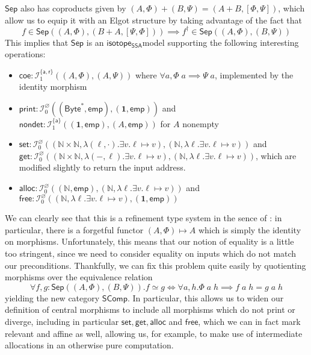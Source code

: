 \documentclass[acmsmall,screen,review]{acmart}
\newcommand{\mc}[1]{\ensuremath{\mathcal{#1}}}
\newcommand{\mb}[1]{\ensuremath{\mathbf{#1}}}
\newcommand{\ms}[1]{\ensuremath{\mathsf{#1}}}
\newcommand{\nats}{\mathbb{N}}
\newcommand{\taff}{{\{\ms{a}\}}}
\newcommand{\tint}{{\{\ms{a}, \ms{r}\}}}
\newcommand{\isotopessa}{\ms{isotope_{SSA}}}
\begin{document}
\(\ms{Sep}\) also has coproducts given by \((A, \Phi) + (B, \Psi) = (A + B, [\Phi, \Psi])\), which allow us to equip it with an Elgot structure by taking advantage of the fact that
\begin{equation}
  f \in \ms{Sep}((A, \Phi), (B + A, [\Psi, \Phi])) \implies f^\dagger \in \ms{Sep}((A, \Phi), (B, \Psi))
\end{equation}
This implies that \(\ms{Sep}\) is an \isotopessa model supporting the following
interesting operations:
\begin{itemize}
  \item \(\ms{coe}: \mc{I}^\tint_1((A, \Phi), (A, \Psi))\) where \(\forall a,
  \Phi\;a \implies \Psi\;a\), implemented by the identity morphism
  \item \(\ms{print}: \mc{I}^\varnothing_0((\ms{Byte}^*, \ms{emp}), (\mb{1},
  \ms{emp}))\) and \(\ms{nondet}: \mc{I}^\taff_1((\mb{1}, \ms{emp}), (A, \ms{emp}))\) for
  \(A\) nonempty
  \item \(\ms{set}: \mc{I}^\varnothing_0((\nats \times \nats, \lambda (\ell,
  \cdot). \exists v. \ell \mapsto v), (\nats, \lambda \ell. \exists v. \ell
  \mapsto v))\) and \(\ms{get}: \mc{I}^\varnothing_0((\nats \times \nats,
  \lambda (-, \ell). \exists v. \ell \mapsto v), (\nats, \lambda \ell. \exists
  v. \ell \mapsto v))\), which are modified slightly to return the input address.
  \item \(\ms{alloc}: \mc{I}^\varnothing_0((\nats, \ms{emp}), (\nats, \lambda
  \ell. \exists v. \ell \mapsto v))\) and \(\ms{free}: \mc{I}^\varnothing_0((\nats, \lambda \ell. \exists v. \ell \mapsto v), (\mb{1}, \ms{emp}))\)
\end{itemize}
We can clearly see that this is a refinement type system in the sence of
\cite{mellies-ftrs}: in particular, there is a forgetful functor \((A, \Phi)
\mapsto A\) which is simply the identity on morphisms. Unfortunately, this means
that our notion of equality is a little too stringent, since we need to consider
equality on inputs which do not match our preconditions. Thankfully, we can fix
this problem quite easily by quotienting morphisms over the equivalence relation
\begin{equation}
  \forall f, g: \ms{Sep}((A, \Phi), (B, \Psi)).
  f \simeq g \iff \forall a, h. \Phi\;a\;h \implies f\;a\;h = g\;a\;h
\end{equation}
yielding the new category \(\ms{SComp}\). In particular, this allows us to widen
our definition of central morphisms to include all morphisms which do not print
or diverge, including in particular \(\ms{set}, \ms{get}, \ms{alloc}\) and
\(\ms{free}\), which we can in fact mark relevant and affine as well, allowing
us, for example, to make use of intermediate allocations in an otherwise pure
computation.
\end{document}
